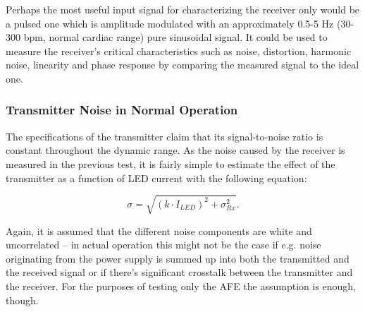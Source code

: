 Perhaps the most useful input signal for characterizing the receiver only would be a pulsed one which is amplitude modulated with an approximately 0.5-5 Hz (30-300 bpm, normal cardiac range) pure sinusoidal signal. It could be used to measure the receiver's critical characteristics such as noise, distortion, harmonic noise, linearity and phase response by comparing the measured signal to the ideal one.

\subsubsection{Transmitter Noise in Normal Operation}

The specifications of the transmitter claim that its signal-to-noise ratio is constant throughout the dynamic range. As the noise caused by the receiver is measured in the previous test, it is fairly simple to estimate the effect of the transmitter as a function of LED current with the following equation:

\begin{equation}
  \sigma = \sqrt{(k \cdot I_{LED})^2 + \sigma_{Rx}^2} .
  \label{eq:sigma_Tx}
\end{equation}

Again, it is assumed that the different noise components are white and uncorrelated -- in actual operation this might not be the case if e.g. noise originating from the power supply is summed up into both the transmitted and the received signal or if there's significant crosstalk between the transmitter and the receiver. For the purposes of testing only the AFE the assumption is enough, though.